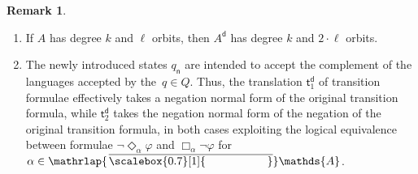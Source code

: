 \documentclass[10pt,a4paper]{amsart}
\theoremstyle{definition}
\newtheorem{rem}[theo]{Remark}
\newcommand{\At}{\mathds{A}}
\newcommand{\trans}{\mathsf{t}}
\newcommand{\negsym}{\mathsf{n}}
\newcommand{\negstate}[1]{#1_{\negsym}}
\newcommand{\dual}[1]{{#1}^\mathsf{d}}
\newcommand{\names}{\At}
\newcommand{\mybar}[3]{%
  \mathrlap{\hspace{#2}\overline{\scalebox{#1}[1]{\phantom{\ensuremath{#3}}}}}\ensuremath{#3}
}
\newcommand{\barNames}{{\mybar{0.7}{1.25pt}{\names}}}
\begin{document}
\begin{rem}
  \begin{enumerate}%
  \item If $A$ has degree $k$ and
    $\ell$ orbits, then $\dual{A}$ has degree $k$ and
    $2 \cdot \ell$ orbits.
  \item The newly introduced states $\negstate{q}$ are intended to
    accept the complement of the languages accepted by the~$q \in Q$. Thus,
    the translation $\dual{\trans}_1$ of transition formulae
    effectively takes a negation normal form of the original
    transition formula, while $\dual{\trans}_2$ takes the negation
    normal form of the negation of the original transition formula, in
    both cases exploiting the logical equivalence between formulae
    $\neg\Diamond_\alpha \varphi$ and $\Box_\alpha \neg\varphi$ for
    $\alpha \in \barNames$.
  \end{enumerate}
\end{rem}
\end{document}
